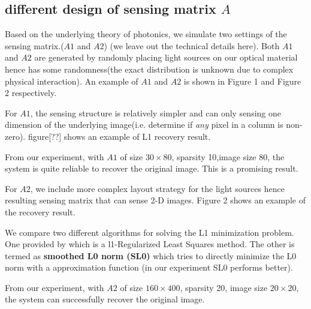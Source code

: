 \documentclass{article} %
\begin{document}
\subsection{}
\subsection{}
\subsection{different design of sensing matrix $A$}
Based on the underlying theory of photonics, we simulate two settings of the sensing matrix.($A1$ and $A2$) (we leave out the technical details here). 
Both $A1$ and $A2$ are generated by randomly placing light sources on our optical material hence has some randomness(the exact distribution is unknown due to complex physical interaction). An example of $A1$ and $A2$ is shown in Figure 1 and Figure 2 respectively.

 For $A1$, the sensing structure is relatively simpler and can only sensing one dimension of the underlying image(i.e. determine if \textit{any} pixel in a column is non-zero). figure[??] shows an example of L1 recovery result.
 
From our experiment, with $A1$ of size $30 \times 80$, sparsity 10,image size 80, the system is quite reliable to recover the original image. This is a promising result.

For $A2$, we include more complex layout strategy for the light sources hence resulting sensing matrix that can sense 2-D images. Figure 2 shows an example of the recovery result.

We compare two different algorithms for solving the L1 minimization problem. One provided by \cite{koh2007interior} which is a l1-Regularized Least Squares method. The other is termed as \textbf{smoothed L0 norm (SL0)}\cite{mohimani2008complex} which tries to directly minimize the L0 norm with a approximation function (in our experiment SL0 performs better).

From our experiment, with $A2$ of size $160 \times 400$, sparsity 20, image size $20 \times 20$, the system can successfully recover the original image. 

%
\end{document}
